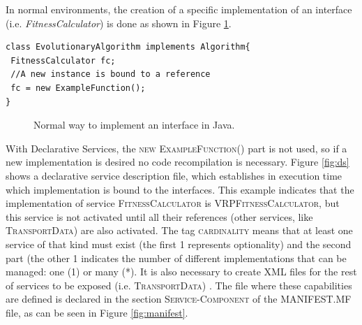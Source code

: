 In normal environments, the creation of a specific implementation of an interface (i.e. {\em FitnessCalculator}) is done as shown in Figure \ref{fig:normalImp}.

\newsavebox{\mintedboxOSGIinst}
\begin{lrbox}{\mintedboxOSGIinst}
\begin{minipage}{10cm}
\begin{verbatim}
class EvolutionaryAlgorithm implements Algorithm{
 FitnessCalculator fc;
 //A new instance is bound to a reference
 fc = new ExampleFunction();
}
\end{verbatim}
\end{minipage}
\end{lrbox}

\begin{figure}
\usebox{\mintedboxOSGIinst}
\caption{Normal way to implement an interface in Java.} 
\label{fig:normalImp} 
\end{figure}


With Declarative Services, the \textsc{new ExampleFunction()} part is not used, so if a new implementation is desired no code recompilation is necessary.  Figure \ref{fig:ds} shows a declarative service description file, which establishes in execution time which implementation is bound to the interfaces. This example indicates that the implementation of service \textsc{FitnessCalculator} is \textsc{VRPFitnessCalculator}, but this service is not activated until all their references (other services, like \textsc{TransportData}) are also activated. The tag \textsc{cardinality} means that at least one service of that kind must exist (the first \textsc{1} represents optionality) and  the second part (the other \textsc{1} indicates the number of different implementations that can be managed: one (\textsc{1}) or many (\textsc{*}). It is also necessary to create XML files for the rest of services to be exposed (i.e. \textsc{TransportData}) . The file where these capabilities are defined is declared in the section \textsc{Service-Component} of the MANIFEST.MF file, as can be seen in Figure \ref{fig:manifest}.



